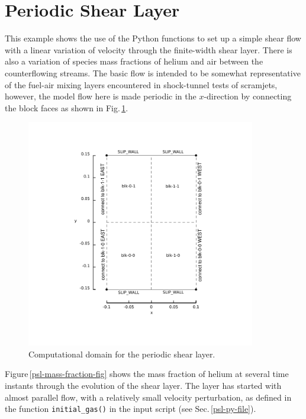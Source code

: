 
\section{Periodic Shear Layer}
\label{periodic-shear-layer-sec}
%
This example shows the use of the Python functions to set up
a simple shear flow with a linear variation of velocity through the finite-width shear layer.
There is also a variation of species mass fractions of helium and air between the counterflowing streams.
The basic flow is intended to be somewhat representative of the fuel-air mixing layers
encountered in shock-tunnel tests of scramjets, however, the model flow here
is made periodic in the $x$-direction by connecting the block faces as shown in
Fig.\,\ref{psl-layout-fig}. 

\begin{figure}[htbp]
\begin{center}
\includegraphics[width=10cm,viewport=94 63 353 396,clip=true]{../2D/periodic-shear-layer/psl-layout.pdf}
\end{center}
\caption{Computational domain for the periodic shear layer.}
\label{psl-layout-fig}
\end{figure}

\medskip
Figure\,\ref{psl-mass-fraction-fig} shows the mass fraction of helium at several time instants through
the evolution of the shear layer.
The layer has started with almost parallel flow, with a relatively small velocity perturbation,
as defined in the function \texttt{initial\_gas()} in the input script (see Sec.\,\ref{psl-py-file}).

